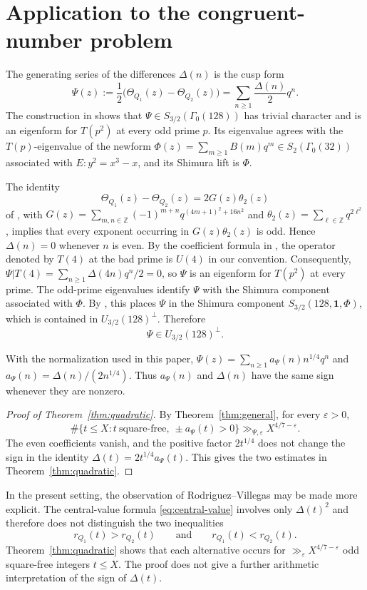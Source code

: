 \documentclass[11pt]{amsart}
\theoremstyle{remark}
\newcommand{\Z}{\mathbb Z}
\begin{document}
\section{Application to the congruent-number problem}\label{sec:application}

The generating series of the differences $\Delta(n)$ is the cusp form
\[
\Psi(z):=\frac12\bigl(\Theta_{Q_1}(z)-\Theta_{Q_2}(z)\bigr)
       =\sum_{n\geq1}\frac{\Delta(n)}2q^n.
\]
The construction in \cite[Section~3]{Qin} shows that
$\Psi\in S_{3/2}(\Gamma_0(128))$ has trivial character and is an
eigenform for $T(p^2)$ at every odd prime $p$. Its eigenvalue agrees with
the $T(p)$-eigenvalue of the newform
$\Phi(z)=\sum_{m\geq1}B(m)q^m\in S_2(\Gamma_0(32))$ associated with
$E:y^2=x^3-x$, and its Shimura lift is $\Phi$.

The identity
\[
\Theta_{Q_1}(z)-\Theta_{Q_2}(z)=2G(z)\theta_2(z)
\]
of \cite[Lemma~3.4]{Qin}, with
$G(z)=\sum_{m,n\in\Z}(-1)^{m+n}q^{(4m+1)^2+16n^2}$ and
$\theta_2(z)=\sum_{\ell\in\Z}q^{2\ell^2}$, implies that every exponent
occurring in $G(z)\theta_2(z)$ is odd. Hence $\Delta(n)=0$ whenever $n$
is even. By the coefficient formula in \cite[Theorem~2.1]{PurkaitHecke}, the
operator denoted by $T(4)$ at the bad prime is $U(4)$ in our convention.
Consequently,
$\Psi|T(4)=\sum_{n\geq1}\Delta(4n)q^n/2=0$, so $\Psi$ is an eigenform
for $T(p^2)$ at every prime. The odd-prime eigenvalues identify $\Psi$
with the Shimura component associated with $\Phi$. By
\cite[Corollary~5.2]{PurkaitDecomposition}, this places \(\Psi\) in
the Shimura component \(S_{3/2}(128,\mathbf 1,\Phi)\), which is
contained in \(U_{3/2}(128)^\perp\). Therefore
\[
\Psi\in U_{3/2}(128)^\perp.
\]

With the normalization used in this paper,
$\Psi(z)=\sum_{n\geq1}a_\Psi(n)n^{1/4}q^n$ and
$a_\Psi(n)=\Delta(n)/(2n^{1/4})$. Thus $a_\Psi(n)$ and $\Delta(n)$ have
the same sign whenever they are nonzero.

\begin{proof}[Proof of Theorem~\ref{thm:quadratic}]
By Theorem~\ref{thm:general}, for every $\varepsilon>0$,
\[
\#\{t\leq X:t\ \mathrm{square\text{-}free},\ \pm a_\Psi(t)>0\}
\gg_{\Psi,\varepsilon}X^{4/7-\varepsilon}.
\]
The even coefficients vanish, and the positive factor $2t^{1/4}$ does
not change the sign in the identity $\Delta(t)=2t^{1/4}a_\Psi(t)$. This
gives the two estimates in Theorem~\ref{thm:quadratic}.
\end{proof}

In the present setting, the observation of Rodriguez--Villegas \cite{RodriguezVillegas} may be
made more explicit.  The central-value formula
\eqref{eq:central-value} involves only $\Delta(t)^2$ and therefore does
not distinguish the two inequalities
\[
r_{Q_1}(t)>r_{Q_2}(t)
\qquad\text{and}\qquad
r_{Q_1}(t)<r_{Q_2}(t).
\]
Theorem~\ref{thm:quadratic} shows that each alternative occurs for
$\gg_\varepsilon X^{4/7-\varepsilon}$ odd square-free integers
$t\leq X$.  The proof does not give a further arithmetic interpretation
of the sign of $\Delta(t)$.
\end{document}
